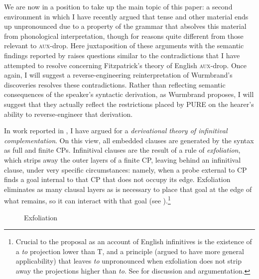 \documentclass[output=paper]{langscibook}
\begin{document}
We are now in a position to take up the main topic of this paper: a second environment in which I have recently argued that tense and other material ends up unpronounced due to a property of the grammar that absolves this material from phonological interpretation, though for reasons quite different from those relevant to \textsc{aux}-drop. Here juxtaposition of these arguments with the semantic findings reported by \citet{Wurmbrand:2014aa} raises questions similar to the contradictions that I have attempted to resolve concerning Fitzpatrick's theory of English \textsc{aux}-drop. Once again, I will suggest a reverse-engineering reinterpretation of Wurmbrand's discoveries resolves these contradictions. Rather than reflecting semantic consequences of the speaker's syntactic derivation, as Wurmbrand proposes, I will suggest that they actually reflect the restrictions placed by PURE on the hearer's ability to reverse-engineer that derivation.

In work reported in \citet{Pesetsky:2019aa}, I have argued for a \textit{derivational theory of infinitival complementation}. On this view, all embedded clauses are generated by the syntax as full and finite CPs. Infinitival clauses are the result of a rule of \textit{exfoliation}, which strips away the outer layers of a finite CP, leaving behind an infinitival clause, under very specific circumstances: namely, when a probe external to CP finds a goal internal to that CP that does not occupy its edge. Exfoliation eliminates as many clausal layers as is necessary to place that goal at the edge of what remains, so it can interact with that goal (see ).\footnote{Crucial to the proposal as an account of English infinitives is the existence of a \textit{to} projection lower than T, and a principle (argued to have more general applicability) that leaves \textit{to} unpronounced when exfoliation does not strip away the projections higher than \textit{to}. See \citet{Pesetsky:2019aa} for discussion and argumentation.}

\begin{figure}
\caption{Exfoliation\label{fig:pesetsky:1}}
\end{figure}
\end{document}
